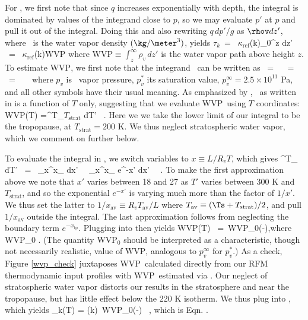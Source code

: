 \documentclass[10pt]{article}
\newcommand{\tauk}{\ensuremath{\tau_k}}
\newcommand{\kapparef}{\ensuremath{\kappa_{\mathrm{ref}}}}
\newcommand{\pref}{\ensuremath{p_{\mathrm{ref}}}}
\newcommand{\WVP}{\ensuremath{\mathrm{WVP}}}
\newcommand{\Tav}{\ensuremath{T_{\mathrm{av}}}}
\newcommand{\Tstrat}{\ensuremath{T_{\mathrm{strat}}}}
\begin{document}
For \htwo, we first note that since $q$ increases exponentially with depth, the integral  is dominated by values of the integrand close to $p$, so we may evaluate $p'$  at $p$ and pull it out of the integral. Doing this and also rewriting $q \,dp'/g$ as $\rhov dz'$, where  \rhov\ is the water vapor density $(\kg/\meter^3)$, yields 
\beqn
	\tauk \  =  \ \kapparef(k)\frac{p}{\pref}\int_0^z \rhov dz' \  =  \ \kapparef(k)\frac{p}{\pref}\WVP
	\label{tauWVP}
\eeqn
where $\WVP\equiv \int_z^\infty  \rho_v\, dz'$ is the water vapor path above height $z$. To estimate \WVP, we first note that the integrand \rhov\ can be written as
\beqa
	\rhov \ = \  \ = \   \ = \   \  \label{rhov}
\eeqa
where $p_v$ is \htwo\ vapor pressure, $p_v^*$ its saturation value, $p_v^\infty = 2.5\times 10^{11} $ Pa, and all other symbols have their usual meaning. As emphasized by  \cite{jeevanjee2017c}, \rhov\ as written in  is a function of $T$ only, suggesting that we evaluate \WVP\ using $T$ coordinates:
	\beqn
		\WVP(T) =\int^T_{\Tstrat} \; dT' \ .
	\label{WVP1}
	\eeqn	
Here we we take the lower limit of our integral to be the tropopause, at $\Tstrat=200$ K. We thus neglect stratospheric water vapor, which we comment on further below.

	To evaluate the integral in , we switch variables to $x\equiv L/R_v T$, which gives
	\beqn
		\int^T_{\Ttp} \; dT' \ = \ \int_x^{x_}  dx' \ \approx\ \int_x^{x_} e^{-x'} dx' \ \approx\ .
		\label{int_approx}
	\eeqn
To make the first approximation above we note that $x'$ varies between 18 and 27  as $T'$ varies between $300$ K and $\Tstrat$, and so the exponential $e^{-x'}$ is varying much more than the factor of $1/x'$. We thus set the latter  to $1/x_{\mathrm{av}}\equiv R_v \Tav/L$ where $\Tav \equiv (\Ts + \Tstrat)/2$, and pull $1/x_{\mathrm{av}}$ outside the integral. The last approximation follows from neglecting the boundary term $e^{-x_\mathrm{tp}}$. Plugging  into  then yields 		
\beqn
		\WVP(T) \ =\ \WVP_0\exp\left(-\right),\quad \mbox{where}\quad  \WVP_0 \equiv \frac{\RH\, p_v^\infty\, \Tav}{L\,\Gamma} \; .
	\label{WVP2}
\eeqn
(The quantity $\WVP_0$ should be interpreted as a characteristic, though not necessarily realistic, value of \WVP, analogous to $p_v^\infty$ for $p_v^*$.)  As a  check, Figure \ref{wvp_check} juxtaposes \WVP\ calculated directly from our RFM thermodynamic input profiles with \WVP\ estimated via . Our neglect of stratospheric water vapor distorts our results in the stratosphere and near the tropopause, but has little effect below the 220 K isotherm. We thus plug  into , which yields 
	\beqn
		\tau_k(T) = \kappa(k)\,  \frac{p}{\pref} \WVP_0\exp\left(-\right) \ ,
	\n
	\eeqn
which is Eqn. . 
\end{document}
